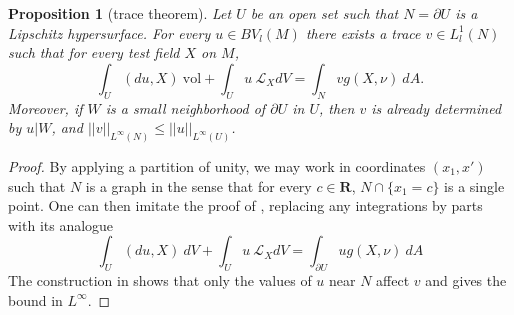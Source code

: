 \documentclass[reqno,12pt,letterpaper]{amsart}
\newcommand{\RR}{\mathbf{R}}
\newcommand{\vol}{\mathrm{vol}}
\newtheorem{proposition}[theorem]{Proposition}
\theoremstyle{definition}
\numberwithin{equation}{section}
\begin{document}
\begin{proposition}[trace theorem]\label{traces}
Let $U$ be an open set such that $N = \partial U$ is a Lipschitz hypersurface.
For every $u \in BV_l(M)$ there exists a trace $v \in L^1_l(N)$ such that for every test field $X$ on $M$,
\begin{equation}\label{Miranda IBP}
\int_U (du, X) ~\vol + \int_U u ~\mathcal L_XdV = \int_N vg(X, \nu) ~dA.
\end{equation}
Moreover, if $W$ is a small neighborhood of $\partial U$ in $U$, then $v$ is already determined by $u|W$, and $||v||_{L^\infty(N)} \leq ||u||_{L^\infty(U)}$.
\end{proposition}
\begin{proof}
By applying a partition of unity, we may work in coordinates $(x_1, x')$ such that $N$ is a graph in the sense that for every $c \in \RR$, $N \cap \{x_1 = c\}$ is a single point.
One can then imitate the proof of \cite[Teorema 1]{Miranda67}, replacing any integrations by parts with its analogue
\begin{equation}
\label{Riemannian IBP}
\int_U (du, X) ~dV + \int_U u ~\mathcal L_XdV = \int_{\partial U} ug(X, \nu) ~dA
\end{equation}
The construction in \cite[Teorema 1]{Miranda67} shows that only the values of $u$ near $N$ affect $v$ and gives the bound in $L^\infty$.
%
%
%
%

\end{proof}
\end{document}
